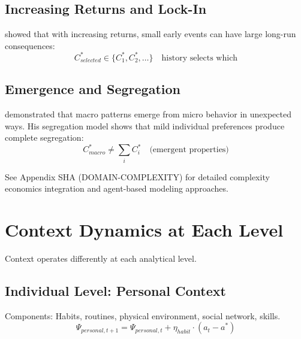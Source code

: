 \subsection{Increasing Returns and Lock-In}

\citet{arthur1989,arthur1994} showed that with increasing returns, small early
events can have large long-run consequences:
\begin{equation}
C^*_{selected} \in \{C^*_1, C^*_2, \ldots\} \quad \text{history selects which}
\label{eq:lock-in}
\end{equation}

\subsection{Emergence and Segregation}

\citet{schelling1971,schelling1978} demonstrated that macro patterns emerge
from micro behavior in unexpected ways. His segregation model shows that
mild individual preferences produce complete segregation:
\begin{equation}
C^*_{macro} \neq \sum_i C^*_i \quad \text{(emergent properties)}
\label{eq:emergence}
\end{equation}

\begin{cross-reference}
See Appendix SHA (DOMAIN-COMPLEXITY) for detailed complexity economics integration
and agent-based modeling approaches.
\end{cross-reference}



\section{Context Dynamics at Each Level}
\label{sec:context-levels}


Context operates differently at each analytical level.

\subsection{Individual Level: Personal Context}

Components: Habits, routines, physical environment, social network, skills.
\begin{equation}
\Psi_{personal, t+1} = \Psi_{personal, t} + \eta_{habit} \cdot (a_t - a^*)
\end{equation}

